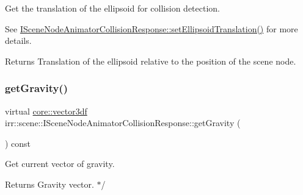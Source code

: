 Get the translation of the ellipsoid for collision detection. 

See \hyperlink{classirr_1_1scene_1_1ISceneNodeAnimatorCollisionResponse_a234ec747d320d70dd3e2a4143782ffc7}{I\+Scene\+Node\+Animator\+Collision\+Response\+::set\+Ellipsoid\+Translation()} for more details. \begin{DoxyReturn}{Returns}
Translation of the ellipsoid relative to the position of the scene node. 
\end{DoxyReturn}
\mbox{\label{classirr_1_1scene_1_1ISceneNodeAnimatorCollisionResponse_a1b7c86e8948691ce00f2aa6253c5683a}} 
\subsubsection{\texorpdfstring{get\+Gravity()}{getGravity()}\hspace{0.1cm}{\footnotesize\ttfamily [1/2]}}
{\footnotesize\ttfamily virtual \hyperlink{namespaceirr_1_1core_ae6e2b2a6c552833ebbd5b7463d03586b}{core\+::vector3df} irr\+::scene\+::\+I\+Scene\+Node\+Animator\+Collision\+Response\+::get\+Gravity (\begin{DoxyParamCaption}{ }\end{DoxyParamCaption}) const\hspace{0.3cm}{\ttfamily [pure virtual]}}



Get current vector of gravity. 

\begin{DoxyReturn}{Returns}
Gravity vector. $\ast$/ 
\end{DoxyReturn}
\mbox{\label{classirr_1_1scene_1_1ISceneNodeAnimatorCollisionResponse_a1b7c86e8948691ce00f2aa6253c5683a}} 
